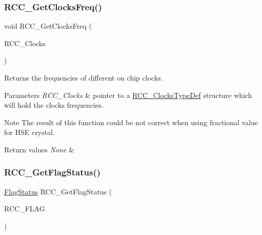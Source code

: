 \subsubsection{\texorpdfstring{RCC\_GetClocksFreq()}{RCC\_GetClocksFreq()}}
{\footnotesize\ttfamily void R\+C\+C\+\_\+\+Get\+Clocks\+Freq (\begin{DoxyParamCaption}\item[{\mbox{\hyperlink{struct_r_c_c___clocks_type_def}{R\+C\+C\+\_\+\+Clocks\+Type\+Def}} $\ast$}]{R\+C\+C\+\_\+\+Clocks }\end{DoxyParamCaption})}



Returns the frequencies of different on chip clocks. 


\begin{DoxyParams}{Parameters}
{\em R\+C\+C\+\_\+\+Clocks} & pointer to a \mbox{\hyperlink{struct_r_c_c___clocks_type_def}{R\+C\+C\+\_\+\+Clocks\+Type\+Def}} structure which will hold the clocks frequencies. \\
\hline
\end{DoxyParams}
\begin{DoxyNote}{Note}
The result of this function could be not correct when using fractional value for H\+SE crystal.
\end{DoxyNote}

\begin{DoxyRetVals}{Return values}
{\em None} & \\
\hline
\end{DoxyRetVals}
\mbox{\label{group___r_c_c___exported___functions_ga2897bdc52f272031c44fb1f72205d295}} 
\subsubsection{\texorpdfstring{RCC\_GetFlagStatus()}{RCC\_GetFlagStatus()}}
{\footnotesize\ttfamily \mbox{\hyperlink{group___exported__types_ga89136caac2e14c55151f527ac02daaff}{Flag\+Status}} R\+C\+C\+\_\+\+Get\+Flag\+Status (\begin{DoxyParamCaption}\item[{uint8\+\_\+t}]{R\+C\+C\+\_\+\+F\+L\+AG }\end{DoxyParamCaption})}



